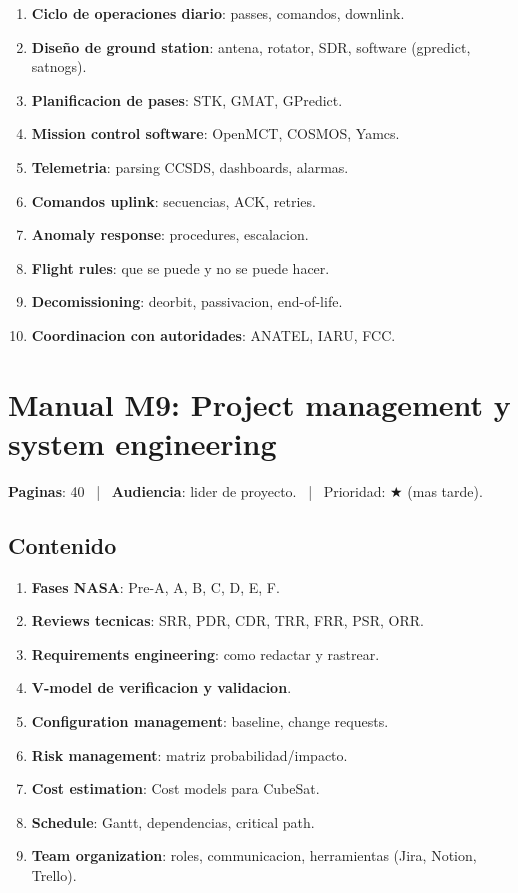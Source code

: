 \documentclass[11pt,a4paper,oneside]{report}
\begin{document}
\begin{enumerate}[leftmargin=2em]
  \item \textbf{Ciclo de operaciones diario}: passes, comandos, downlink.
  \item \textbf{Diseño de ground station}: antena, rotator, SDR,
        software (gpredict, satnogs).
  \item \textbf{Planificacion de pases}: STK, GMAT, GPredict.
  \item \textbf{Mission control software}: OpenMCT, COSMOS, Yamcs.
  \item \textbf{Telemetria}: parsing CCSDS, dashboards, alarmas.
  \item \textbf{Comandos uplink}: secuencias, ACK, retries.
  \item \textbf{Anomaly response}: procedures, escalacion.
  \item \textbf{Flight rules}: que se puede y no se puede hacer.
  \item \textbf{Decomissioning}: deorbit, passivacion, end-of-life.
  \item \textbf{Coordinacion con autoridades}: ANATEL, IARU, FCC.
\end{enumerate}

\chapter{Manual M9: Project management y system engineering}

\textbf{Paginas}: 40 ~|~ \textbf{Audiencia}: lider de proyecto.
~|~ Prioridad: $\bigstar$ (mas tarde).

\section{Contenido}

\begin{enumerate}[leftmargin=2em]
  \item \textbf{Fases NASA}: Pre-A, A, B, C, D, E, F.
  \item \textbf{Reviews tecnicas}: SRR, PDR, CDR, TRR, FRR, PSR, ORR.
  \item \textbf{Requirements engineering}: como redactar y rastrear.
  \item \textbf{V-model de verificacion y validacion}.
  \item \textbf{Configuration management}: baseline, change requests.
  \item \textbf{Risk management}: matriz probabilidad/impacto.
  \item \textbf{Cost estimation}: Cost models para CubeSat.
  \item \textbf{Schedule}: Gantt, dependencias, critical path.
  \item \textbf{Team organization}: roles, communicacion, herramientas
        (Jira, Notion, Trello).
\end{enumerate}
\end{document}
